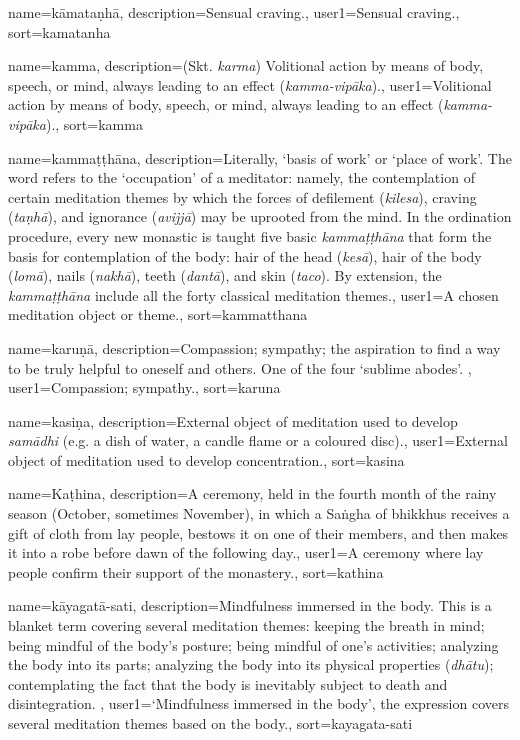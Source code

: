 {
name=k\=amata\d{n}h\=a,
description={Sensual craving.},
user1={Sensual craving.},
sort={kamatanha}
}

{
name=kamma,
description={(Skt. \textit{karma}) Volitional action by means of body, speech, or mind, always leading to an effect (\textit{kamma-vip\=aka}).},
user1={Volitional action by means of body, speech, or mind, always leading to an effect (\textit{kamma-vip\=aka}).},
sort={kamma}
}

{
name={kamma\d{t}\d{t}h\=ana},
description={Literally, `basis of work' or `place of work'. The word refers to the `occupation' of a meditator: namely, the contemplation of certain meditation themes by which the forces of defilement (\textit{kilesa}), craving (\textit{ta\d{n}h\=a}), and ignorance (\textit{avijj\=a}) may be uprooted from the mind. In the ordination procedure, every new monastic is taught five basic \textit{kamma\d{t}\d{t}h\=ana} that form the basis for contemplation of the body: hair of the head (\textit{kes\=a}), hair of the body (\textit{lom\=a}), nails (\textit{nakh\=a}), teeth (\textit{dant\=a}), and skin (\textit{taco}). By extension, the \textit{kamma\d{t}\d{t}h\=ana} include all the forty classical meditation themes.},
user1={A chosen meditation object or theme.},
sort={kammatthana}
}

{
name={karu\d{n}\=a},
description={Compassion; sympathy; the aspiration to find a way to be truly helpful to oneself and others. One of the four `sublime abodes'. \protect \seepre %
\protect {}%
\protect \seepost %
},
user1={Compassion; sympathy.},
sort={karuna}
}

{
name=kasi\d{n}a,
description={External object of meditation used to develop \textit{sam\=adhi} (e.g. a dish of water, a candle flame or a coloured disc).},
user1={External object of meditation used to develop concentration.},
sort={kasina}
}

{
name={Ka\d{t}hina},
description={A ceremony, held in the fourth month of the rainy season (October, sometimes November), in which a Sa\.ngha of bhikkhus receives a gift of cloth from lay people, bestows it on one of their members, and then makes it into a robe before dawn of the following day.},
user1={A ceremony where lay people confirm their support of the monastery.},
sort={kathina}
}

{
name={k\=ayagat\=a-sati},
description={Mindfulness immersed in the body. This is a blanket term covering several meditation themes: keeping the breath in mind; being mindful of the body's posture; being mindful of one's activities; analyzing the body into its parts; analyzing the body into its physical properties (\textit{dh\=atu}); contemplating the fact that the body is inevitably subject to death and disintegration. \protect \seepre %
\protect {}%
\protect \seepost %
},
user1={`Mindfulness immersed in the body', the expression covers several meditation themes based on the body.},
sort={kayagata-sati}
}

